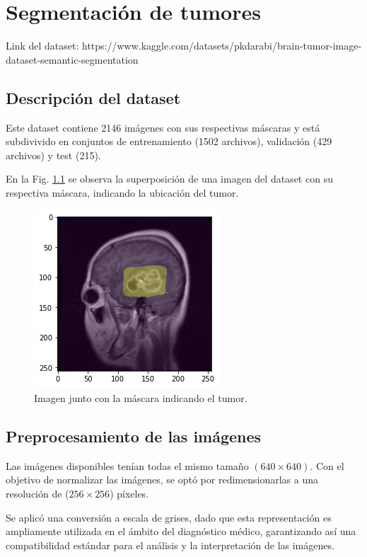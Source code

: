 
\chapter{Segmentación de tumores}

Link del dataset: https://www.kaggle.com/datasets/pkdarabi/brain-tumor-image-dataset-semantic-segmentation

\section{Descripción del dataset}

Este dataset contiene 2146 imágenes con sus respectivas máscaras y está subdivivido en conjuntos de entrenamiento (1502 archivos), validación (429 archivos) y test (215).

 En la Fig. \ref{fig.mask} se observa la superposición de una imagen del dataset con su respectiva máscara, indicando la ubicación del tumor.
 
 
\begin{figure}[H]
\centering
        \includegraphics[width=0.4\linewidth]{chapters/segmentacion/images/mask.png}
        \caption{Imagen junto con la máscara indicando el tumor.}
        \label{fig.mask}
  \end{figure}


\section{Preprocesamiento de las imágenes}

Las imágenes disponibles tenían todas el mismo tamaño $(640\times640)$. Con el objetivo de normalizar las imágenes, se optó por redimensionarlas a una resolución de ($256 \times 256$) píxeles. 

Se aplicó una conversión a escala de grises, dado que esta representación es ampliamente utilizada en el ámbito del diagnóstico médico, garantizando así una compatibilidad estándar para el análisis y la interpretación de las imágenes.

